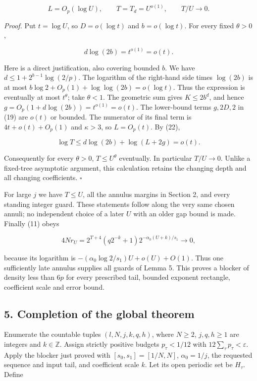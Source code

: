 \documentclass[
  11pt,
]{article}
\begin{document}
\[
 L=O_p(\log U),\qquad T=T_d=U^{o(1)},\qquad T/U\to0.        \tag{23}
\]

\emph{Proof.} Put \(t=\log  U\), so \(D=o(\log  t)\) and
\(b=o(\log  t)\). For every fixed \(\theta >0\),

\[
 d\log(2b)=t^{o(1)}=o(t).                                   \tag{24}
\]

Here is a direct justification, also covering bounded \(b\). We have
\(d\le 1+2^{b-1}\log (2/p)\). The logarithm of the right-hand side times
\(\log (2b)\) is at most \(b \log 2+O_p(1)+\log\log (2b)=o(\log  t)\).
Thus the expression is eventually at most \(t^\theta\); take
\(\theta <1\). The geometric sum gives \(K\le 2b^d\), and hence
\(g=O_p(1+d \log (2b))=t^{o(1)}=o(t)\). The lower-bound terms \(g,2D,2\)
in (19) are \(o(t)\) or bounded. The numerator of its final term is
\(4t+o(t)+O_p(1)\) and \(\kappa >3\), so \(L=O_p(t)\). By (22),

\[
 \log T\le d\log(2b)+\log(L+2g)=o(t).
\]

Consequently for every \(\theta >0\), \(T\le U^\theta\) eventually. In
particular \(T/U\to 0\). Unlike a fixed-tree asymptotic argument, this
calculation retains the changing depth and all changing coefficients.
\(\square\)

For large \(j\) we have \(T\le U\), all the annulus margins in Section
2, and every standing integer guard. These statements follow along the
very same chosen annuli; no independent choice of a later \(U\) with an
older gap bound is made. Finally (11) obeys

\[
 4Nr_U=2^{T+4}(q2^{-k}+1)2^{-\alpha_0(U+k)/s_1}\to0,        \tag{25}
\]

because its logarithm is \(-(\alpha _0 \log 2/s_1)U+o(U)+O(1)\). Thus
one sufficiently late annulus supplies all guards of Lemma 5. This
proves a blocker of density less than \(6p\) for every prescribed tail,
bounded exponent rectangle, coefficient scale and error bound.

\subsection{5. Completion of the global
theorem}\label{completion-of-the-global-theorem}

Enumerate the countable tuples \((l,N,j,k,q,h)\), where \(N\ge 2\),
\(j,q,h\ge 1\) are integers and \(k\in\mathbb Z\). Assign strictly
positive budgets \(p_\tau <1/12\) with
\(12\sum _\tau  p_\tau <\varepsilon\). Apply the blocker just proved
with \([s_0,s_1]=[1/N,N]\), \(\alpha _0=1/j\), the requested sequence
and input tail, and coefficient scale \(k\). Let its open periodic set
be \(H_\tau\). Define
\end{document}

